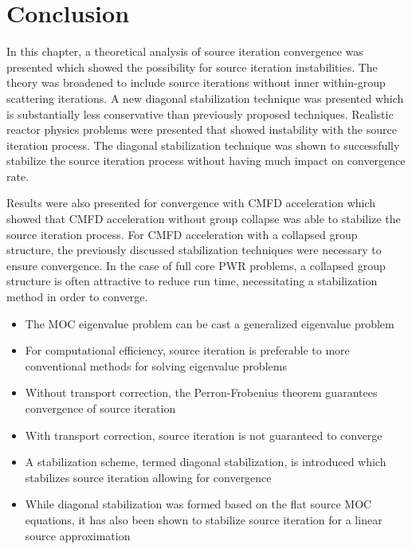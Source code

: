 \section{Conclusion}
\label{sec:convergence-conclusion}

In this chapter, a theoretical analysis of source iteration convergence was presented which showed the possibility for source iteration instabilities. The theory was broadened to include source iterations without inner within-group scattering iterations. A new diagonal stabilization technique was presented which is substantially less conservative than previously proposed techniques. Realistic reactor physics problems were presented that showed instability with the source iteration process. The diagonal stabilization technique was shown to successfully stabilize the source iteration process without having much impact on convergence rate.

Results were also presented for convergence with \ac{CMFD} acceleration which showed that \ac{CMFD} acceleration without group collapse was able to stabilize the source iteration process. For \ac{CMFD} acceleration with a collapsed group structure, the previously discussed stabilization techniques were necessary to ensure convergence. In the case of full core \ac{PWR} problems, a collapsed group structure is often attractive to reduce run time, necessitating a stabilization method in order to converge.


\vfill
\begin{highlightsbox}[frametitle=Highlights]
	\begin{itemize}
		
		\item The \ac{MOC} eigenvalue problem can be cast a generalized eigenvalue problem
		
		\item For computational efficiency, source iteration is preferable to more conventional methods for solving eigenvalue problems
		
		\item Without transport correction, the Perron-Frobenius theorem guarantees convergence of source iteration
		
		\item With transport correction, source iteration is not guaranteed to converge
		
		\item A stabilization scheme, termed diagonal stabilization, is introduced which stabilizes source iteration allowing for convergence
		
		\item While diagonal stabilization was formed based on the flat source \ac{MOC} equations, it has also been shown to stabilize source iteration for a linear source approximation
		
	\end{itemize}
\end{highlightsbox}
\vfill